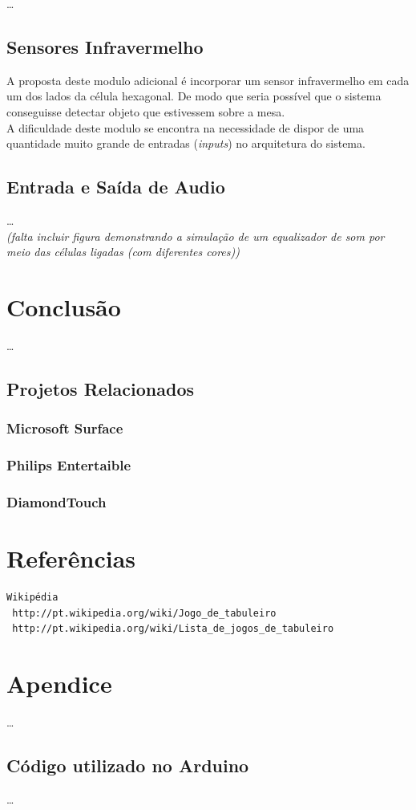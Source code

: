 \documentclass[a4paper,10pt]{article}
\begin{document}
\ldots

\subsection{Sensores Infravermelho}

A proposta deste modulo adicional é incorporar um sensor infravermelho em cada um dos lados da célula hexagonal. De modo que seria possível que o sistema conseguisse detectar objeto que estivessem sobre a mesa. \\

A dificuldade deste modulo se encontra na necessidade de dispor de uma quantidade muito grande de entradas ({\it inputs}) no arquitetura do sistema.

\subsection{Entrada e Saída de Audio}

\ldots \\

{\it (falta incluir figura demonstrando a simulação de um equalizador de som por meio das células ligadas (com diferentes cores))}

\section{Conclusão}

\ldots

\subsection{Projetos Relacionados}

\subsubsection{Microsoft Surface}
\subsubsection{Philips Entertaible}
\subsubsection{DiamondTouch}

\section{Referências}

\begin{verbatim}
Wikipédia
 http://pt.wikipedia.org/wiki/Jogo_de_tabuleiro
 http://pt.wikipedia.org/wiki/Lista_de_jogos_de_tabuleiro 
\end{verbatim}

\section{Apendice}

\ldots

\subsection{Código utilizado no Arduino}

\ldots
\end{document}
